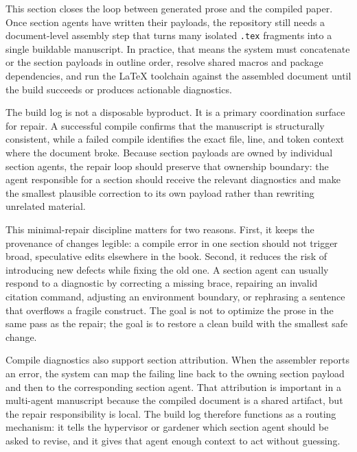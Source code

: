 \documentclass[11pt]{article}
\begin{document}

This section closes the loop between generated prose and the compiled paper. Once section agents have written their payloads, the repository still needs a document-level assembly step that turns many isolated \texttt{.tex} fragments into a single buildable manuscript. In practice, that means the system must concatenate or \texttt{} the section payloads in outline order, resolve shared macros and package dependencies, and run the LaTeX toolchain against the assembled document until the build succeeds or produces actionable diagnostics.

The build log is not a disposable byproduct. It is a primary coordination surface for repair. A successful compile confirms that the manuscript is structurally consistent, while a failed compile identifies the exact file, line, and token context where the document broke. Because section payloads are owned by individual section agents, the repair loop should preserve that ownership boundary: the agent responsible for a section should receive the relevant diagnostics and make the smallest plausible correction to its own payload rather than rewriting unrelated material.

This minimal-repair discipline matters for two reasons. First, it keeps the provenance of changes legible: a compile error in one section should not trigger broad, speculative edits elsewhere in the book. Second, it reduces the risk of introducing new defects while fixing the old one. A section agent can usually respond to a diagnostic by correcting a missing brace, repairing an invalid citation command, adjusting an environment boundary, or rephrasing a sentence that overflows a fragile construct. The goal is not to optimize the prose in the same pass as the repair; the goal is to restore a clean build with the smallest safe change.

Compile diagnostics also support section attribution. When the assembler reports an error, the system can map the failing line back to the owning section payload and then to the corresponding section agent. That attribution is important in a multi-agent manuscript because the compiled document is a shared artifact, but the repair responsibility is local. The build log therefore functions as a routing mechanism: it tells the hypervisor or gardener which section agent should be asked to revise, and it gives that agent enough context to act without guessing.
\end{document}
